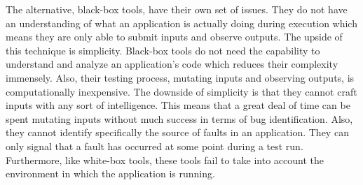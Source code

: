    The alternative, black-box tools, have their own set of issues. They do not have an understanding of what an
    application is actually doing during execution which means they are only able to submit inputs and observe
    outputs.  The upside of this technique is simplicity. Black-box tools do not need the capability to understand
    and analyze an application's code which reduces their complexity immensely. Also, their testing process,
    mutating inputs and observing outputs, is computationally inexpensive. The downside of simplicity is that they
    cannot craft inputs with any sort of intelligence. This means that a great deal of time can be spent mutating
    inputs without much success in terms of bug identification. Also, they cannot identify specifically the source
    of faults in an application. They can only signal that a fault has occurred at some point during a test run.
    Furthermore, like white-box tools, these tools fail to take into account the environment in which the
    application is running.